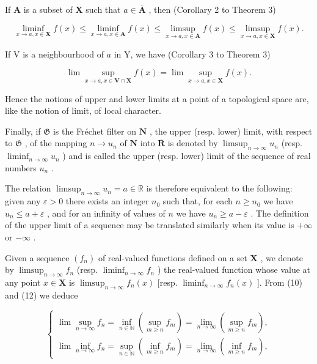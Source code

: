 If \(\mathbf{A}\) is a subset of \(\mathbf{X}\) such that \(a \in \overline{\mathbf{A}}\) , then (Corollary 2 to Theorem 3)

\[
\liminf _ {x \to a, x \in \mathbf {X}} f (x) \leqslant \liminf _ {x \to a, x \in \mathbf {A}} f (x) \leqslant \limsup _ {x \to a, x \in \mathbf {A}} f (x) \leqslant \limsup _ {x \to a, x \in \mathbf {X}} f (x).
\]

If V is a neighbourhood of \(a\) in Y, we have (Corollary 3 to Theorem 3)

\[
\lim \sup _ {x \to a, x \in \mathbf {V} \cap \mathbf {X}} f (x) = \lim \sup _ {x \to a, x \in \mathbf {X}} f (x).
\]

Hence the notions of upper and lower limits at a point of a topological space are, like the notion of limit, of local character.

Finally, if \(\mathfrak{G}\) is the Fréchet filter on \(\mathbf{N}\) , the upper (resp. lower) limit, with respect to \(\mathfrak{G}\) , of the mapping \(n \to u_n\) of \(\mathbf{N}\) into \(\overline{\mathbf{R}}\) is denoted by \(\limsup_{n \to \infty} u_n\) (resp. \(\liminf_{n \to \infty} u_n\) ) and is called the upper (resp. lower) limit of the sequence of real numbers \(u_n\) .

The relation \(\limsup_{n\to \infty}u_n = a\in \mathbb{R}\) is therefore equivalent to the following: given any \(\varepsilon >0\) there exists an integer \(n_0\) such that, for each \(n\geqslant n_0\) we have \(u_{n}\leqslant a + \varepsilon\) , and for an infinity of values of \(n\) we have \(u_{n}\geqslant a - \varepsilon\) . The definition of the upper limit of a sequence may be translated similarly when its value is \(+\infty\) or \(-\infty\) .

Given a sequence \((f_n)\) of real-valued functions defined on a set \(\mathbf{X}\) , we denote by \(\limsup_{n\to \infty}f_n\) (resp. \(\liminf_{n\to \infty} f_n\) ) the real-valued function whose value at any point \(x\in \mathbf{X}\) is \(\limsup_{n\to \infty}f_n(x)\) {[}resp. \(\liminf_{n\to \infty} f_n(x)\) {]}. From (10) and (12) we deduce

\[
\left\{\begin{array}{l}\lim \sup _ {n \rightarrow \infty} f _ {n} = \inf _ {n \in \mathbb {N}} (\sup _ {m \geqslant n} f _ {m}) = \lim _ {n \rightarrow \infty} (\sup _ {m \geqslant n} f _ {m}),\\\lim \inf _ {n \rightarrow \infty} f _ {n} = \sup _ {n \in \mathbb {N}} (\inf _ {m \geqslant n} f _ {m}) = \lim _ {n \rightarrow \infty} (\inf _ {m \geqslant n} f _ {m}),\end{array}\right.\tag{16}
\]

